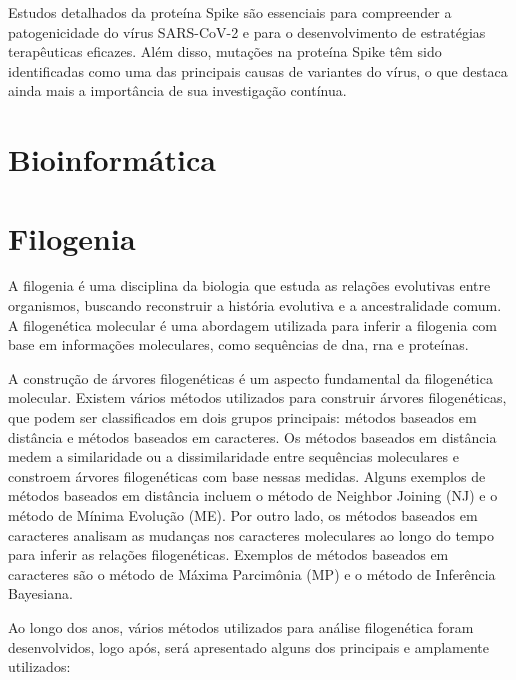 Estudos detalhados da proteína Spike são essenciais para compreender a patogenicidade do vírus SARS-CoV-2 e para o desenvolvimento de estratégias terapêuticas eficazes. Além disso, mutações na proteína Spike têm sido identificadas como uma das principais causas de variantes do vírus, o que destaca ainda mais a importância de sua investigação contínua.

\section{Bioinformática}


\section{Filogenia}

A filogenia é uma disciplina da biologia que estuda as relações evolutivas entre organismos, buscando reconstruir a história evolutiva e a ancestralidade comum. A filogenética molecular é uma abordagem utilizada para inferir a filogenia com base em informações moleculares, como sequências de \gls{dna}, \gls{rna} e proteínas\cite{felsenstein_inferring_2004}.

A construção de árvores filogenéticas é um aspecto fundamental da filogenética molecular. Existem vários métodos utilizados para construir árvores filogenéticas, que podem ser classificados em dois grupos principais: métodos baseados em distância e métodos baseados em caracteres.
Os métodos baseados em distância medem a similaridade ou a dissimilaridade entre sequências moleculares e constroem árvores filogenéticas com base nessas medidas. Alguns exemplos de métodos baseados em distância incluem o método de Neighbor Joining (NJ) e o método de Mínima Evolução (ME).
Por outro lado, os métodos baseados em caracteres analisam as mudanças nos caracteres moleculares ao longo do tempo para inferir as relações filogenéticas. Exemplos de métodos baseados em caracteres são o método de Máxima Parcimônia (MP) e o método de Inferência Bayesiana\cite{swofford_phylogenetic_1996}.

Ao longo dos anos, vários métodos utilizados para análise filogenética foram desenvolvidos, logo após, será apresentado alguns dos principais e amplamente utilizados:

